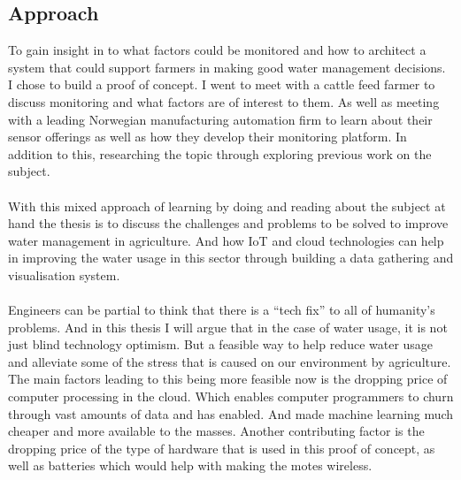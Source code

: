 \documentclass[]{uiophd}
\begin{document}
\subsection{Approach}
To gain insight in to what factors could be monitored and how to architect a system that could support farmers in making good water management decisions. I chose to build a proof of concept. I went to meet with a cattle feed farmer to discuss monitoring and what factors are of interest to them. As well as meeting with a leading Norwegian manufacturing automation firm to learn about their sensor offerings as well as how they develop their monitoring platform. In addition to this, researching the topic through exploring previous work on the subject.
\\\\
With this mixed approach of learning by doing and reading about the subject at hand the thesis is to discuss the challenges and problems to be solved to improve water management in agriculture. And how IoT and cloud technologies can help in improving the water usage in this sector through building a data gathering and visualisation system.
\\\\
Engineers can be partial to think that there is a “tech fix” to all of humanity's problems. And in this thesis I will argue that in the case of water usage, it is not just blind technology optimism. But a feasible way to help reduce water usage and alleviate some of the stress that is caused on our environment by agriculture. The main factors leading to this being more feasible now is the dropping price of computer processing in the cloud. Which enables computer programmers to churn through vast amounts of data and has enabled. And made machine learning much cheaper and more available to the masses. Another contributing factor is the dropping price of the type of hardware that is used in this proof of concept, as well as batteries which would help with making the motes wireless.
\end{document}
